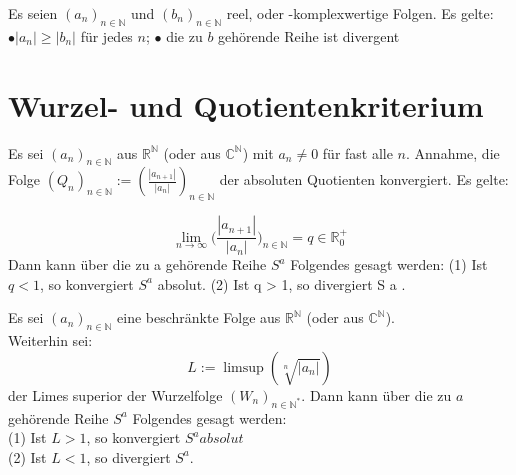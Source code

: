 \begin{theorem}[Minorantenkriterium]
 
Es seien $(a_n)_{n \in \mathbb{N}}$ und $(b_n)_{n \in \mathbb{N}}$ reel, oder -komplexwertige Folgen. Es gelte:
\newline
$\bullet |a_n| \geq |b_n|$ für jedes $n$;
\newline
$\bullet$ die zu $b$ gehörende Reihe ist divergent
 
\end{theorem}
\newpage
\section{Wurzel- und Quotientenkriterium}
\begin{theorem}[Quotientenkriterium]
Es sei $(a_n)_{n \in \mathbb{N}}$ aus $\mathbb{R}^{\mathbb{N}}$ (oder aus $\mathbb{C}^{\mathbb{N}}$) mit $a_n \neq 0$ für fast alle $n$. Annahme, die Folge
$(Q_n)_{n \in \mathbb{N}} := (\frac{|a_{n+1}|}{|a_n|})_{n \in \mathbb{N}}$
der absoluten Quotienten konvergiert. Es gelte:

$$
\lim_{n \to \infty}\bigg(\frac{|a_{n+1}|}{|a_n|}\bigg)_{n \in \mathbb{N}} = q \in \mathbb{R}^{+}_{0} 
$$
Dann kann über die zu a gehörende Reihe $S^a$ Folgendes gesagt werden:
\newline
(1) Ist $q < 1$, so konvergiert $S^a$ absolut.
\newline
(2) Ist q > 1, so divergiert S a .
\end{theorem}

\begin{theorem}[Wurzelkriterium]

Es sei $(a_n)_{n \in \mathbb{N}}$ eine beschränkte Folge aus $\mathbb{R}^{\mathbb{N}}$ (oder aus $\mathbb{C}^{\mathbb{N}}$).
\\
Weiterhin sei:
$$
L := \limsup (\sqrt[n]{|a_n|})
$$
der Limes superior der Wurzelfolge $(W_n)_{n \in \mathbb{N}^*}$. Dann kann über die zu $a$ gehörende Reihe $S^a$ Folgendes gesagt werden:
\\
(1) Ist $L > 1$, so konvergiert $S^a absolut$
\\
(2) Ist $L < 1$, so divergiert $S^a$.

\end{theorem}


